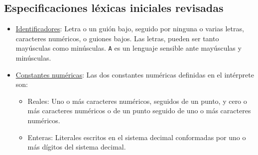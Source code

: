 \documentclass[12pt]{article}
\begin{document}
\subsection{Especificaciones léxicas iniciales revisadas}
\begin{itemize}
    \item \underline{Identificadores}:  Letra o un guión bajo, seguido por ninguna o varias letras, caracteres numéricos, o guiones bajos. Las letras, pueden ser tanto mayúsculas como minúsculas. \texttt{A} es un lenguaje sensible ante mayúsculas y minúsculas.
    \item \underline{Constantes numéricas}: Las dos constantes numéricas definidas en el intérprete son:
    \begin{itemize}
        \item Reales:  Uno o más caracteres numéricos, seguidos de un punto, y cero o más caracteres numéricos o de un punto seguido de uno o más caracteres numéricos.
        \item Enteras: Literales escritos en el sistema decimal conformadas por uno o más dígitos del sistema decimal.
        

\end{itemize}
\end{itemize}
\end{document}
